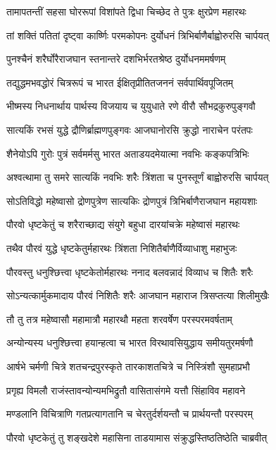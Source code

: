 \twolineshloka
{तामापतन्तीं सहसा घोररूपां विशांपते}
{द्विधा चिच्छेद ते पुत्रः क्षुरप्रेण महारथः}


\twolineshloka
{तां शक्तिं पतितां दृष्ट्वा कार्ष्णिः परमकोपनः}
{दुर्योधनं त्रिभिर्बाणैर्बाह्वोरुरसि चार्पयत्}


\twolineshloka
{पुनश्चैनं शरैर्घोरैराजघान स्तनान्तरे}
{दशभिर्भरतश्रेष्ठ दुर्योधनममर्षणम्}


\twolineshloka
{तद्युद्धमभवद्धोरं चित्ररूपं च भारत}
{ईक्षितृप्रीतितजननं सर्वपार्थिवपूजितम्}


\twolineshloka
{भीष्मस्य निधनार्थाय पार्थस्य विजयाय च}
{युयुधाते रणे वीरौ सौभद्रकुरुपुङ्गवौ}


\twolineshloka
{सात्यकिं रभसं युद्धे द्रौणिर्ब्राह्मणपुङ्गवः}
{आजघानोरसि क्रुद्धो नाराचेन परंतपः}


\twolineshloka
{शैनेयोऽपि गुरोः पुत्रं सर्वमर्मसु भारत}
{अताडयदमेयात्मा नवभिः कङ्कपत्रिभिः}


\twolineshloka
{अश्वत्थामा तु समरे सात्यकिं नवभिः शरैः}
{त्रिंशता च पुनस्तूर्णं बाह्वोरुरसि चार्पयत्}


\twolineshloka
{सोऽतिविद्धो महेष्वासो द्रोणपुत्रेण सात्यकिः}
{द्रोणपुत्रं त्रिभिर्बाणैराजघान महायशाः}


\twolineshloka
{पौरवो धृष्टकेतुं च शरैराच्छाद्य संयुगे}
{बहुधा दारयांचक्रे महेष्वासं महारथः}


\twolineshloka
{तथैव पौरवं युद्धे धृष्टकेतुर्महारथः}
{त्रिंशता निशितैर्बाणैर्विव्याधाशु महाभुजः}


\twolineshloka
{पौरवस्तु धनुश्छित्त्वा धृष्टकेतोर्महारथः}
{ननाद बलवन्नादं विव्याध च शितैः शरैः}


\twolineshloka
{सोऽन्यत्कार्मुकमादाय पौरवं निशितैः शरैः}
{आजघान महाराज त्रिसप्तत्या शिलीमुखैः}


\twolineshloka
{तौ तु तत्र महेष्वासौ महामात्रौ महारथौ}
{महता शरवर्षेण परस्परमवर्षताम्}


\twolineshloka
{अन्योन्यस्य धनुश्छित्त्वा हयान्हत्वा च भारत}
{विरथावसियुद्धाय समीयतुरमर्षणौ}


\twolineshloka
{आर्षभे चर्मणी चित्रे शतचन्द्रपुरस्कृते}
{तारकाशतचित्रे च निस्त्रिंशौ सुमहाप्रभौ}


\twolineshloka
{प्रगृह्य विमलौ राजंस्तावन्योन्यमभिद्रुतौ}
{वासितासंगमे यत्तौ सिंहाविव महावने}


\twolineshloka
{मण्डलानि विचित्राणि गतप्रत्यागतानि च}
{चेरतुर्दर्शयन्तौ च प्रार्थयन्तौ परस्परम्}


\twolineshloka
{पौरवो धृष्टकेतुं तु शङ्खदेशे महासिना}
{ताडयामास संक्रुद्धस्तिष्ठतिष्ठेति चाब्रवीत्}


